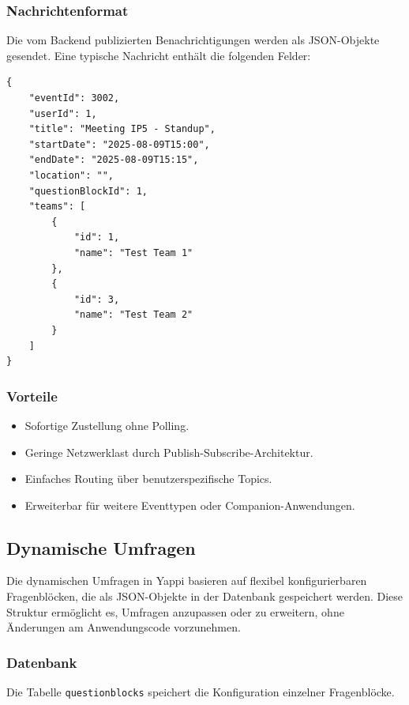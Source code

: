 \documentclass[12pt,a4paper]{report}
\begin{document}
    \subsubsection{Nachrichtenformat}
        Die vom Backend publizierten Benachrichtigungen werden als JSON-Objekte gesendet.
        Eine typische Nachricht enthält die folgenden Felder:

\begin{verbatim}
{
    "eventId": 3002,
    "userId": 1,
    "title": "Meeting IP5 - Standup",
    "startDate": "2025-08-09T15:00",
    "endDate": "2025-08-09T15:15",
    "location": "",
    "questionBlockId": 1,
    "teams": [
        {
            "id": 1,
            "name": "Test Team 1"
        },
        {
            "id": 3,
            "name": "Test Team 2"
        }
    ]
}
\end{verbatim}

    \subsubsection{Vorteile}
        \begin{itemize}
            \item Sofortige Zustellung ohne Polling.
            \item Geringe Netzwerklast durch Publish-Subscribe-Architektur.
            \item Einfaches Routing über benutzerspezifische Topics.
            \item Erweiterbar für weitere Eventtypen oder Companion-Anwendungen.
        \end{itemize}



\subsection{Dynamische Umfragen}
    Die dynamischen Umfragen in Yappi basieren auf flexibel konfigurierbaren Fragenblöcken, die als JSON-Objekte in der Datenbank gespeichert werden.
    Diese Struktur ermöglicht es, Umfragen anzupassen oder zu erweitern, ohne Änderungen am Anwendungscode vorzunehmen.

    \subsubsection{Datenbank}
        Die Tabelle \texttt{questionblocks} speichert die Konfiguration einzelner Fragenblöcke.
\end{document}
